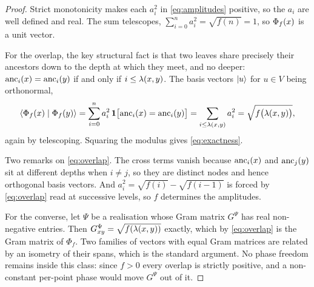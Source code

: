\begin{proof}
  Strict monotonicity makes each $a_i^{2}$ in \cref{eq:amplitudes} positive, so the
  $a_i$ are well defined and real. The sum telescopes,
  $\sum_{i=0}^{n} a_i^{2} = \sqrt{f(n)} = 1$, so $\Phi_f(x)$ is a unit vector.

  For the overlap, the key structural fact is that two leaves share precisely their
  ancestors down to the depth at which they meet, and no deeper: $\operatorname{anc}_i(x) = \operatorname{anc}_i(y)$
  if and only if $i \le \lambda(x,y)$. The basis vectors $\lvert u \rangle$ for $u \in V$ being
  orthonormal,
  \begin{equation}
    \label{eq:overlap}
    \langle \Phi_f(x) \mid \Phi_f(y) \rangle
    = \sum_{i=0}^{n} a_i^{2} \,\mathbf{1}\bigl[\operatorname{anc}_i(x) = \operatorname{anc}_i(y)\bigr]
    = \sum_{i \le \lambda(x,y)} a_i^{2}
    = \sqrt{f\bigl(\lambda(x,y)\bigr)} ,
  \end{equation}
  again by telescoping. Squaring the modulus gives \cref{eq:exactness}.

  Two remarks on \cref{eq:overlap}. The cross terms vanish because $\operatorname{anc}_i(x)$ and
  $\operatorname{anc}_j(y)$ sit at different depths when $i \ne j$, so they are distinct nodes and
  hence orthogonal basis vectors. And $a_i^{2} = \sqrt{f(i)} - \sqrt{f(i-1)}$ is forced
  by \cref{eq:overlap} read at successive levels, so $f$ determines the amplitudes.

  For the converse, let $\Psi$ be a realisation whose Gram matrix $G^{\Psi}$ has real
  non-negative entries. Then $G^{\Psi}_{xy} = \sqrt{f(\lambda(x,y))}$ exactly, which
  by \cref{eq:overlap} is the Gram matrix of $\Phi_f$. Two families of vectors with
  equal Gram matrices are related by an isometry of their spans, which is the standard
  argument. No phase freedom remains inside this class: since $f > 0$ every overlap is
  strictly positive, and a non-constant per-point phase would move $G^{\Psi}$ out of it.
\end{proof}

